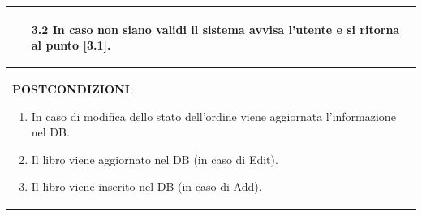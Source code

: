 \documentclass[a4paper,11pt]{report}
\begin{document}
\begin{table}[h!]
\begin{tabularx}{\textwidth}{|X|}
\begin{enumerate}
\begin{enumerate}
            \item [3.2] In caso non siano validi il sistema avvisa l'utente e si ritorna al punto [3.1].
        \end{enumerate}
      \end{enumerate} \\
      \hline
      \textbf{POSTCONDIZIONI}:
      \begin{enumerate}
        \item In caso di modifica dello stato dell'ordine viene aggiornata l'informazione nel DB. 
        \item Il libro viene aggiornato nel DB (in caso di Edit).
        \item Il libro viene inserito nel DB (in caso di Add).
      \end{enumerate} \\
      \hline
    \end{tabularx}
  \end{table}
  \clearpage
  
\end{document}
